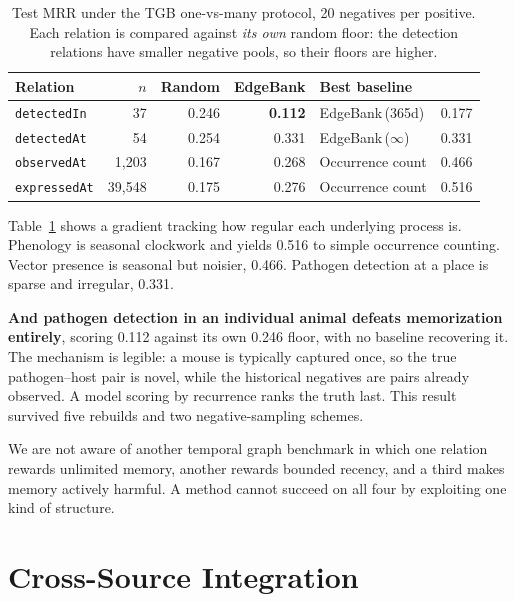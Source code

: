 \begin{table}[t]
\centering
\caption{Test MRR under the TGB one-vs-many protocol, 20 negatives per
positive. Each relation is compared against \emph{its own} random floor: the
detection relations have smaller negative pools, so their floors are higher.}
\label{tab:baselines}
\small
\begin{tabular}{lrrrlr}
\toprule
\textbf{Relation} & \textbf{$n$} & \textbf{Random} & \textbf{EdgeBank} &
\textbf{Best baseline} & \\
\midrule
\texttt{detectedIn}  &     37 & 0.246 & \textbf{0.112} & EdgeBank\,(365d)  & 0.177 \\
\texttt{detectedAt}  &     54 & 0.254 & 0.331 & EdgeBank\,($\infty$)      & 0.331 \\
\texttt{observedAt}  & 1{,}203 & 0.167 & 0.268 & Occurrence count         & 0.466 \\
\texttt{expressedAt} & 39{,}548 & 0.175 & 0.276 & Occurrence count        & 0.516 \\
\bottomrule
\end{tabular}
\end{table}

Table~\ref{tab:baselines} shows a gradient tracking how regular each underlying
process is. Phenology is seasonal clockwork and yields 0.516 to simple
occurrence counting. Vector presence is seasonal but noisier, 0.466. Pathogen
detection at a place is sparse and irregular, 0.331.

\textbf{And pathogen detection in an individual animal defeats memorization
entirely}, scoring 0.112 against its own 0.246 floor, with no baseline
recovering it. The mechanism is legible: a mouse is typically captured once, so
the true pathogen--host pair is novel, while the historical negatives are pairs
already observed. A model scoring by recurrence ranks the truth last. This
result survived five rebuilds and two negative-sampling schemes.

We are not aware of another temporal graph benchmark in which one relation
rewards unlimited memory, another rewards bounded recency, and a third makes
memory actively harmful. A method cannot succeed on all four by exploiting one
kind of structure.

\section{Cross-Source Integration}
\label{sec:crosssource}

